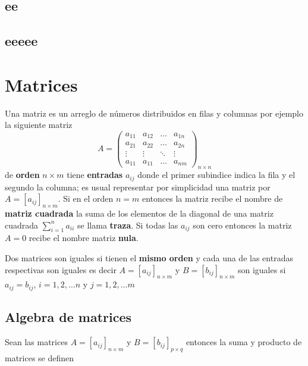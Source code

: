 \documentclass[10pt,]{krantz}
\theoremstyle{definition}
\theoremstyle{definition}
\theoremstyle{definition}
\theoremstyle{remark}
\begin{document}
\hypertarget{ee}{%
\section{ee}\label{ee}}

\hypertarget{eeeee}{%
\section{eeeee}\label{eeeee}}

\hypertarget{matrices}{%
\chapter{Matrices}\label{matrices}}

Una matriz es un arreglo de números distribuidos en filas y columnas por ejemplo la siguiente matriz
\[A=\begin{pmatrix}
a_{11}&a_{12}&\ldots&a_{1n}\\
a_{21}&a_{22}&\ldots&a_{2n}\\
\vdots & \vdots & \ddots &\vdots \\
a_{11}&a_{11}&\ldots&a_{nm}
\end{pmatrix}_{n\times n}\]
de \textbf{orden} \(n\times m\) tiene \textbf{entradas} \(a_{ij}\) donde el primer subindice indica la fila y el segundo la columna; es usual representar por simplicidad una matriz por \(A=[a_{ij}]_{n\times m}\). Si en el orden \(n=m\) entonces la matriz recibe el nombre de \textbf{matriz cuadrada} la suma de los elementos de la diagonal de una matriz cuadrada \(\sum_{i=1}^na_{ii}\) se llama \textbf{traza}. Si todas las \(a_{ij}\) son cero entonces la matriz \(A=0\) recibe el nombre matriz \textbf{nula}.

Dos matrices son iguales si tienen el \textbf{mismo orden} y cada una de las entradas respectivas son iguales es decir \(A=[a_{ij}]_{n\times m}\) y \(B=[b_{ij}]_{n\times m}\) son iguales si \(a_{ij}=b_{ij}\), \(i=1,2,\ldots n\) y \(j=1,2,\ldots m\)

\hypertarget{algebra-de-matrices}{%
\section{Algebra de matrices}\label{algebra-de-matrices}}

Sean las matrices \(A=[a_{ij}]_{n\times m}\) y \(B=[b_{ij}]_{p\times q}\) entonces la suma y producto de matrices se definen
\end{document}
